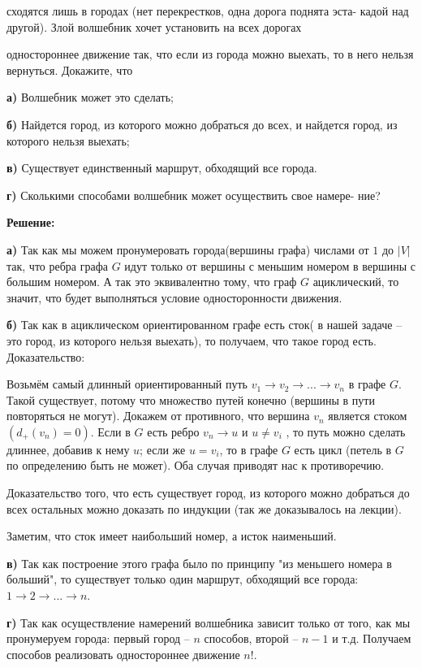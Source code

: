 \documentclass[a4paper,12pt]{article} %
\begin{document}
сходятся лишь в городах (нет перекрестков, одна дорога поднята эста-
кадой над другой). Злой волшебник хочет установить на всех дорогах

одностороннее движение так, что если из города можно выехать, то в
него нельзя вернуться. Докажите, что

{\bf а)} Волшебник может это сделать;

{\bf б)} Найдется город, из которого можно добраться до всех, и найдется
город, из которого нельзя выехать;

{\bf в)} Существует единственный маршрут, обходящий все города.

{\bf г)} Сколькими способами волшебник может осуществить свое намере-
ние?
\begin{center}
\bfseries
{\Large Решение: }
\end{center}

{\bf а)} Так как мы можем пронумеровать города(вершины графа) числами от $1$ до $|V|$ так, что ребра графа $G$ идут только от вершины с меньшим номером в вершины с большим номером. А так это эквивалентно тому, что граф $G$ ациклический, то значит, что будет выполняться условие односторонности движения.

{\bf б)} Так как в ациклическом ориентированном графе есть сток( в нашей задаче -- это город, из которого нельзя выехать), то получаем, что такое город есть. Доказательство:

Возьмём самый длинный ориентированный путь $v_1 \rightarrow v_2 \rightarrow . . . \rightarrow v_n$ в графе $G$. Такой существует, потому что множество путей конечно
(вершины в пути повторяться не могут). Докажем от противного, что вершина $v_n$
является стоком $(d_{+}(v_n) = 0)$. Если в $G$ есть ребро $v_n \rightarrow u$ и $u \neq v_i$ , то путь можно сделать длиннее, добавив к нему $u$; если же $u = v_i$, то в графе $G$ есть цикл (петель в $G$ по определению быть не может). Оба случая приводят нас к противоречию.

Доказательство того, что есть существует город, из которого можно добраться до всех остальных можно доказать по индукции (так же доказывалось на лекции).

Заметим, что сток имеет наибольший номер, а исток наименьший.

{\bf в)} Так как построение этого графа было по принципу "из меньшего номера в больший", то существует только один маршрут, обходящий все города: $1\rightarrow 2 \rightarrow ... \rightarrow n$.

{\bf г)} Так как осуществление намерений волшебника зависит только от того, как мы пронумеруем города: первый город -- $n$ способов, второй -- $n - 1$ и т.д. Получаем способов реализовать одностороннее движение $n!$.
\end{document}

